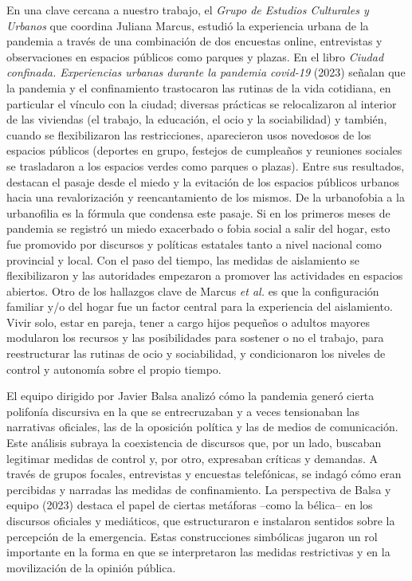 En una clave cercana a nuestro trabajo, el \emph{Grupo de Estudios Culturales y Urbanos} que coordina Juliana Marcus, estudió la experiencia urbana de la pandemia a través de una combinación de dos encuestas online, entrevistas y observaciones en espacios públicos como parques y plazas. En el libro \emph{Ciudad confinada. Experiencias urbanas durante la pandemia covid-19} (2023) señalan que la pandemia y el confinamiento trastocaron las rutinas de la vida cotidiana, en particular el vínculo con la ciudad; diversas prácticas se relocalizaron al interior de las viviendas (el trabajo, la educación, el ocio y la sociabilidad) y también, cuando se flexibilizaron las restricciones, aparecieron usos novedosos de los espacios públicos (deportes en grupo, festejos de cumpleaños y reuniones sociales se trasladaron a los espacios verdes como parques o plazas). Entre sus resultados, destacan el pasaje desde el miedo y la evitación de los espacios públicos urbanos hacia una revalorización y reencantamiento de los mismos. De la urbanofobia a la urbanofilia es la fórmula que condensa este pasaje. Si en los primeros meses de pandemia se registró un miedo exacerbado o fobia social a salir del hogar, esto fue promovido por discursos y políticas estatales tanto a nivel nacional como provincial y local. Con el paso del tiempo, las medidas de aislamiento se flexibilizaron y las autoridades empezaron a promover las actividades en espacios abiertos. Otro de los hallazgos clave de Marcus \emph{et al.} es que la configuración familiar y/o del hogar fue un factor central para la experiencia del aislamiento. Vivir solo, estar en pareja, tener a cargo hijos pequeños o adultos mayores modularon los recursos y las posibilidades para sostener o no el trabajo, para reestructurar las rutinas de ocio y sociabilidad, y condicionaron los niveles de control y autonomía sobre el propio tiempo.

El equipo dirigido por Javier Balsa analizó cómo la pandemia generó cierta polifonía discursiva en la que se entrecruzaban y a veces tensionaban las narrativas oficiales, las de la oposición política y las de medios de comunicación. Este análisis subraya la coexistencia de discursos que, por un lado, buscaban legitimar medidas de control y, por otro, expresaban críticas y demandas. A través de grupos focales, entrevistas y encuestas telefónicas, se indagó cómo eran percibidas y narradas las medidas de confinamiento. La perspectiva de Balsa y equipo (2023) destaca el papel de ciertas metáforas --como la bélica-- en los discursos oficiales y mediáticos, que estructuraron e instalaron sentidos sobre la percepción de la emergencia. Estas construcciones simbólicas jugaron un rol importante en la forma en que se interpretaron las medidas restrictivas y en la movilización de la opinión pública.

